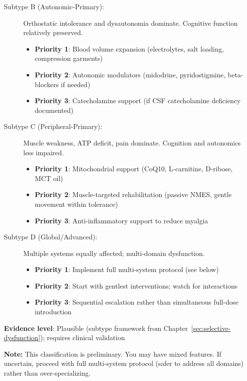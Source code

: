 \begin{recommendation}
\begin{description}
    \item[Subtype B (Autonomic-Primary):] Orthostatic intolerance and dysautonomia dominate. Cognitive function relatively preserved.
    \begin{itemize}
        \item \textbf{Priority 1}: Blood volume expansion (electrolytes, salt loading, compression garments)
        \item \textbf{Priority 2}: Autonomic modulators (midodrine, pyridostigmine, beta-blockers if needed)
        \item \textbf{Priority 3}: Catecholamine support (if CSF catecholamine deficiency documented)
    \end{itemize}

    \item[Subtype C (Peripheral-Primary):] Muscle weakness, ATP deficit, pain dominate. Cognition and autonomics less impaired.
    \begin{itemize}
        \item \textbf{Priority 1}: Mitochondrial support (CoQ10, L-carnitine, D-ribose, MCT oil)
        \item \textbf{Priority 2}: Muscle-targeted rehabilitation (passive NMES, gentle movement within tolerance)
        \item \textbf{Priority 3}: Anti-inflammatory support to reduce myalgia
    \end{itemize}

    \item[Subtype D (Global/Advanced):] Multiple systems equally affected; multi-domain dysfunction.
    \begin{itemize}
        \item \textbf{Priority 1}: Implement full multi-system protocol (see below)
        \item \textbf{Priority 2}: Start with gentlest interventions; watch for interactions
        \item \textbf{Priority 3}: Sequential escalation rather than simultaneous full-dose introduction
    \end{itemize}
\end{description}

\textbf{Evidence level}: Plausible (subtype framework from Chapter~\ref{sec:selective-dysfunction}); requires clinical validation

\textbf{Note:} This classification is preliminary. You may have mixed features. If uncertain, proceed with full multi-system protocol (safer to address all domains) rather than over-specializing.

\end{recommendation}

